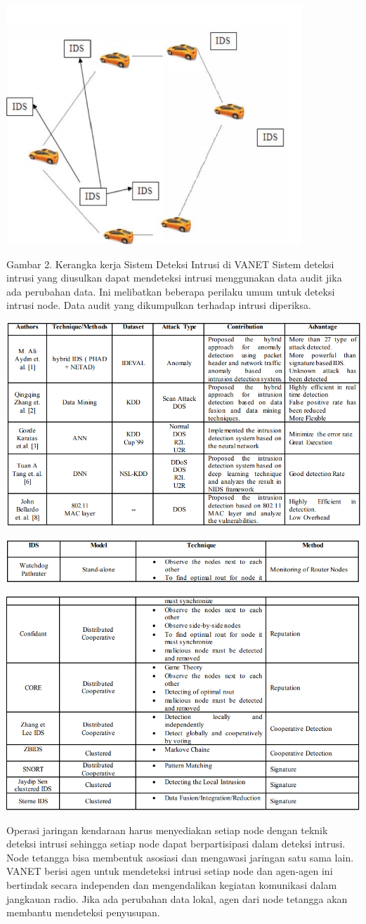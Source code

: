 \documentclass[conference]{IEEEtran}
\begin{document}
\begin{center}
    \centering
    \includegraphics[width=.4\textwidth]{gambar/tugas7-2.PNG}
    \end{center}
    Gambar 2. Kerangka kerja Sistem Deteksi Intrusi di VANET
    Sistem deteksi intrusi yang diusulkan dapat mendeteksi
    intrusi menggunakan data audit jika ada perubahan data. Ini
    melibatkan beberapa perilaku umum untuk deteksi intrusi
    node. Data audit yang dikumpulkan terhadap intrusi diperiksa.
    \begin{center}
        \centering
        \includegraphics[width=.4\textwidth]{gambar/a.PNG}
        \end{center}
        \begin{center}
        \centering
        \includegraphics[width=.4\textwidth]{gambar/b.PNG}
        \end{center}
        \begin{center}
        \centering
        \includegraphics[width=.4\textwidth]{gambar/c.PNG}
        \end{center}
        
Operasi jaringan kendaraan harus menyediakan setiap node dengan
teknik deteksi intrusi sehingga setiap node dapat
berpartisipasi dalam deteksi intrusi. Node tetangga bisa
membentuk asosiasi dan mengawasi jaringan satu sama lain.
VANET berisi agen untuk mendeteksi intrusi setiap node
dan agen-agen ini bertindak secara independen dan mengendalikan
kegiatan komunikasi dalam jangkauan radio. Jika ada
perubahan data lokal, agen dari node tetangga akan
membantu mendeteksi penyusupan.
\end{document}
